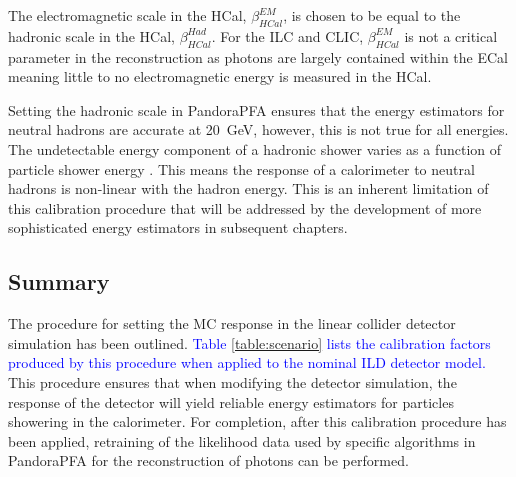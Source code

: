 The electromagnetic scale in the HCal, $\beta^{EM}_{HCal}$, is chosen to be equal to the hadronic scale in the HCal, $\beta^{Had}_{HCal}$.  For the ILC and CLIC, $\beta^{EM}_{HCal}$ is not a critical parameter in the reconstruction as photons are largely contained within the ECal meaning little to no electromagnetic energy is measured in the HCal.  

Setting the hadronic scale in PandoraPFA ensures that the energy estimators for neutral hadrons are accurate at 20~GeV, however, this is not true for all energies.  The undetectable energy component of a hadronic shower varies as a function of particle shower energy \cite{Wigmans:2000vf}.  This means the response of a calorimeter to neutral hadrons is non-linear with the hadron energy.  This is an inherent limitation of this calibration procedure that will be addressed by the development of more sophisticated energy estimators in subsequent chapters.  


\subsection{Summary}
The procedure for setting the MC response in the linear collider detector simulation has been outlined.  \textcolor{blue}{Table \ref{table:scenario} lists the calibration factors produced by this procedure when applied to the nominal ILD detector model.}  This procedure ensures that when modifying the detector simulation, the response of the detector will yield reliable energy estimators for particles showering in the calorimeter.  For completion, after this calibration procedure has been applied, retraining of the likelihood data used by specific algorithms in PandoraPFA for the reconstruction of photons can be performed.  


